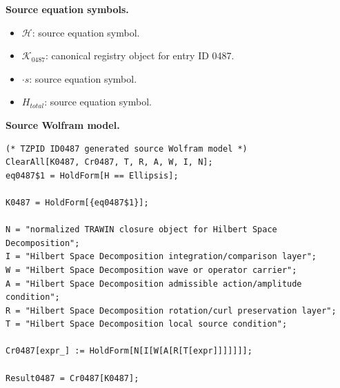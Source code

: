 \begin{minipage}[t]{0.49\linewidth}
\begingroup
\small
\raggedright
\textbf{Source equation symbols.}\par
\begin{itemize}[leftmargin=1.35em,itemsep=1pt,topsep=1pt,parsep=0pt]
    \item $\mathcal{H}$: source equation symbol.
    \item $\mathcal{K}_{0487}$: canonical registry object for entry ID 0487.
    \item $\cdot s$: source equation symbol.
    \item $H_{total}$: source equation symbol.
\end{itemize}
\endgroup
\end{minipage}\hfill
\begin{minipage}[t]{0.47\linewidth}
\begingroup
\scriptsize
\raggedright
\textbf{Source Wolfram model.}\par
\begin{Verbatim}[fontsize=\tiny,breaklines=true,breakanywhere=true]
(* TZPID ID0487 generated source Wolfram model *)
ClearAll[K0487, Cr0487, T, R, A, W, I, N];
eq0487$1 = HoldForm[H == Ellipsis];

K0487 = HoldForm[{eq0487$1}];

N = "normalized TRAWIN closure object for Hilbert Space Decomposition";
I = "Hilbert Space Decomposition integration/comparison layer";
W = "Hilbert Space Decomposition wave or operator carrier";
A = "Hilbert Space Decomposition admissible action/amplitude condition";
R = "Hilbert Space Decomposition rotation/curl preservation layer";
T = "Hilbert Space Decomposition local source condition";

Cr0487[expr_] := HoldForm[N[I[W[A[R[T[expr]]]]]]];

Result0487 = Cr0487[K0487];
\end{Verbatim}
\endgroup
\end{minipage}

